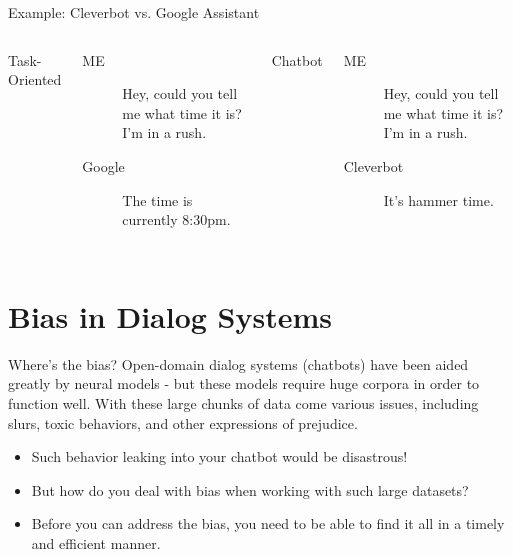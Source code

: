 \documentclass[10pt]{beamer}
\begin{document}
 

\begin{frame}{Example: Cleverbot vs. Google Assistant}

    \begin{columns}[T,onlytextwidth]


      Task-Oriented

      \begin{description}

        \item[ME] Hey, could you tell me what time it is? I'm in a rush. \item[Google] The time is currently 8:30pm.

      \end{description}

 


      Chatbot

      \begin{description}

        \item[ME] Hey, could you tell me what time it is? I'm in a rush. \item[Cleverbot] It's hammer time.

      \end{description}

  \end{columns}

\end{frame}

\section[Bias in Dialog Systems]{Bias in Dialog Systems}

\begin{frame}{Where's the bias?}
Open-domain dialog systems (chatbots) have been aided greatly by neural models - but these models require huge corpora in order to function well. With these large chunks of data come various issues, including slurs, toxic behaviors, and other expressions of prejudice.
\begin{itemize}
    \item Such behavior leaking into your chatbot would be disastrous!
    \item But how do you deal with bias when working with such large datasets?
    \item Before you can address the bias, you need to be able to find it all in a timely and efficient manner.
\end{itemize}
\end{frame}
\end{document}
